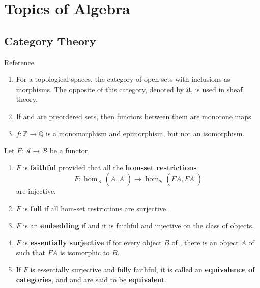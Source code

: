 \part{Topics of Algebra}


\chapter{Category Theory}

Reference \cite{adamekAbstractConcreteCategories,richterCategoriesHomotopyTheory2020} %


    

\begin{example}
    \begin{enumerate}
        \item For a topological spaces, the category of open sets with inclusions as morphisms. The opposite of this category, denoted by $\mathfrak{U}$, is used in sheaf theory.
        \item If \ca and \cb are preordered sets, then functors between them are monotone maps.
        \item $f: \mathbb{Z} \rightarrow \mathbb{Q}$ is a monomorphism and epimorphism, but not an isomorphism.
    \end{enumerate}
\end{example}


\noindent Let $F: \mathcal{A} \rightarrow \mathcal{B}$ be a functor.
\begin{enumerate}
    \item $F$ is \textbf{faithful} provided that all the \textbf{hom-set restrictions}
    $$
    F: \operatorname{hom}_{\mathcal{A}}\left(A, A^{\prime}\right) \rightarrow \operatorname{hom}_{\mathcal{B}}\left(F A, F A^{\prime}\right)
    $$
    are injective.
    \item $F$ is \textbf{full} if all hom-set restrictions are surjective.
    \item $F$ is an \textbf{embedding} if and it is faithful and injective on the class of objects.
    \item $F$ is \textbf{essentially surjective} if for every object $B$ of \cb, there is an object $A$ of \ca such that $F A$ is isomorphic to $B$. 
    \item If $F$ is essentially surjective and fully faithful, it is called an \textbf{equivalence of categories}, and \ca and \cb are said to be \textbf{equivalent}.
\end{enumerate}

